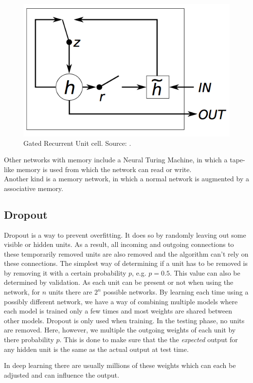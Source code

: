 \documentclass[a4paper, 11pt]{article}
\begin{document}
\begin{figure}[htb]
    \centering
    \includegraphics[width=0.6\linewidth]{images/gru.png}
    \caption[Gated Recurrent Unit cell]{Gated Recurrent Unit cell. Source: \cite{journals/corr/ChungGCB14}.}
    \label{fig:gru}
\end{figure}

Other networks with memory include a Neural Turing Machine, in which a tape-like memory is used from which the network can read or write.\\
Another kind is a memory network, in which a normal network is augmented by a associative memory.\\

\subsection{Dropout}
Dropout is a way to prevent overfitting. It does so by randomly leaving out some visible or hidden units. As a result, all incoming and outgoing connections to these temporarily removed units are also removed and the algorithm can't rely on these connections. The simplest way of determining if a unit has to be removed is by removing it with a certain probability $p$, e.g. $p=0.5$. This value can also be determined by validation. As each unit can be present or not when using the network, for $n$ units there are $2^n$ possible networks.
By learning each time using a possibly different network, we have a way of combining multiple models where each model is trained only a few times and most weights are shared between other models. Dropout is only used when training. In the testing phase, no units are removed. Here, however, we multiple the outgoing weights of each unit by there probability $p$.
This is done to make sure that the the \textit{expected} output for any hidden unit is the same as the actual output at test time.

In deep learning there are usually millions of these weights which can each be adjusted and can influence the output.
\end{document}
